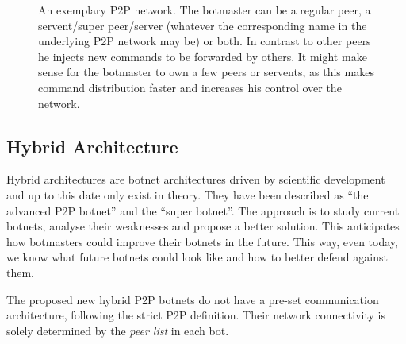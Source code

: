 \documentclass{llncs}
\begin{document}
\begin{figure}[htbp]
  \centering
  \caption{An exemplary P2P network. The botmaster can be a regular
    peer, a servent/super peer/server (whatever the corresponding name
    in the underlying P2P network may be) or both. In contrast to other peers
    he injects new commands to be forwarded by others. It might make
    sense for the botmaster to own a few peers or servents, as this
    makes command distribution faster and increases his control over
    the network.}
  \label{p2p-network}
\end{figure}


\subsection{Hybrid Architecture}
\label{hybrid}
Hybrid architectures are botnet architectures driven by scientific
development and up to this date only exist in theory. They have been
described as ``the advanced P2P botnet''\cite{td1sc} and the ``super
botnet''\cite{vogt2007army}. The approach is to study current botnets,
analyse their weaknesses and propose a better solution. This
anticipates how botmasters could improve their botnets in the
future. This way, even today, we know what future botnets could look
like and how to better defend against them.

The proposed new hybrid P2P botnets do not have a pre-set
communication architecture, following the strict P2P definition. Their
network connectivity is solely determined by the {\it peer list} in
each bot.
\end{document}
